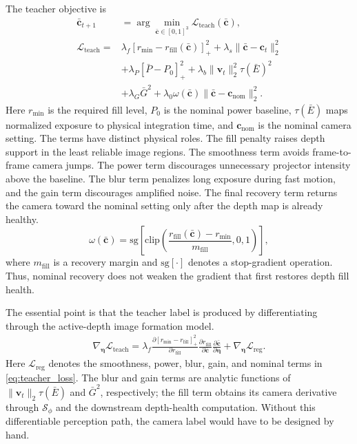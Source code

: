 \documentclass[letterpaper,journal]{IEEEtran}
\begin{document}
The teacher objective is
\begin{equation}
\begin{aligned}
    \bar{\mathbf{c}}_{t+1}
    &=\arg\min_{\bar{\mathbf{c}}\in[0,1]^3}
    \mathcal{L}_{\mathrm{teach}}(\bar{\mathbf{c}}),\\
    \mathcal{L}_{\mathrm{teach}}
    =&\lambda_f[r_{\min}-r_{\mathrm{fill}}(\bar{\mathbf{c}})]_+^2
    +\lambda_s\|\bar{\mathbf{c}}-\mathbf{c}_t\|_2^2\\
    &+\lambda_P[\bar P-P_0]_+^2
    +\lambda_b\|\mathbf{v}_t\|_2^2\tau(\bar E)^2\\
    &+\lambda_G\bar G^2
    +\lambda_0\omega(\bar{\mathbf{c}})
    \|\bar{\mathbf{c}}-\mathbf{c}_{\mathrm{nom}}\|_2^2 .
    \label{eq:teacher_loss}
\end{aligned}
\end{equation}
Here $r_{\min}$ is the required fill level, $P_0$ is the nominal power
baseline, $\tau(\bar E)$ maps normalized exposure to physical integration
time, and $\mathbf{c}_{\mathrm{nom}}$ is the nominal camera setting. The terms
have distinct physical roles. The fill penalty raises depth support in the
least reliable image regions. The smoothness term avoids frame-to-frame camera
jumps. The power term discourages unnecessary projector intensity above the
baseline. The blur term penalizes long exposure during fast motion, and the
gain term discourages amplified noise. The final recovery term returns the
camera toward the nominal setting only after the depth map is already healthy.
\begin{equation}
    \omega(\bar{\mathbf{c}})=
    \mathrm{sg}\!\left[
    \mathrm{clip}\!\left(
    \frac{r_{\mathrm{fill}}(\bar{\mathbf{c}})-r_{\min}}{m_{\mathrm{fill}}},
    0,1\right)\right],
    \label{eq:nominal_gate}
\end{equation}
where $m_{\mathrm{fill}}$ is a recovery margin and $\mathrm{sg}[\cdot]$
denotes a stop-gradient operation. Thus, nominal recovery does not weaken the
gradient that first restores depth fill health.

The essential point is that the teacher label is produced by differentiating
through the active-depth image formation model.
\begin{equation}
\begin{aligned}
    \nabla_{\boldsymbol{\eta}}\mathcal{L}_{\mathrm{teach}}
    =
    \lambda_f
    \frac{\partial [r_{\min}-r_{\mathrm{fill}}]_+^2}
    {\partial r_{\mathrm{fill}}}
    \frac{\partial r_{\mathrm{fill}}}{\partial\bar{\mathbf{c}}}
    \frac{\partial\bar{\mathbf{c}}}{\partial\boldsymbol{\eta}}
    +\nabla_{\boldsymbol{\eta}}\mathcal{L}_{\mathrm{reg}} .
    \label{eq:teacher_gradient}
\end{aligned}
\end{equation}
Here $\mathcal{L}_{\mathrm{reg}}$ denotes the smoothness, power, blur, gain,
and nominal terms in \eqref{eq:teacher_loss}. The blur and gain terms are
analytic functions of $\|\mathbf{v}_t\|_2\tau(\bar E)$ and $\bar G^2$,
respectively; the fill term obtains its camera derivative through
$\mathcal{S}_{\phi}$ and the downstream depth-health computation. Without this
differentiable perception path, the camera label would have to be designed by
hand.
\end{document}
